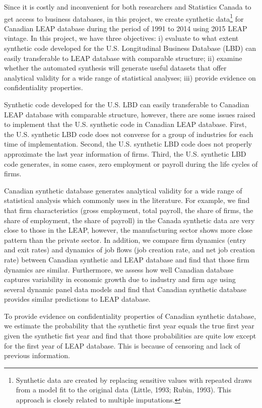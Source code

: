 \documentclass{article}
\begin{document}
Since it is costly and inconvenient for both researchers and Statistics Canada to get access to business databases, in this project, we create synthetic data\footnote{Synthetic data are created by replacing sensitive values with repeated draws from a model fit to the original data (Little, 1993; Rubin, 1993). This approach is closely related to multiple imputations.} for Canadian LEAP database during the period of 1991 to 2014 using 2015 LEAP vintage. In this project, we have three objectives: i) evaluate to what extent synthetic code developed for the U.S. Longitudinal Business Database (LBD) can easily transferable to LEAP database with comparable structure; ii) examine whether the automated synthesis will generate useful datasets that offer analytical validity for a wide range of statistical analyses; iii) provide evidence on confidentiality properties. 

Synthetic code developed for the U.S. LBD can easily transferable to Canadian LEAP database with comparable structure, however, there are some issues raised to implement that the U.S. synthetic code in Canadian LEAP database. First, the U.S. synthetic LBD code does not converse for a group of industries for each time of implementation. Second, the U.S. synthetic LBD code does not properly approximate the last year information of firms. Third, the U.S. synthetic LBD code generates, in some cases, zero employment or payroll during the life cycles of firms.   

Canadian synthetic database generates analytical validity for a wide range of statistical analysis which commonly uses in the literature. For example, we find that firm characteristics (gross employment, total payroll, the share of firms, the share of employment, the share of payroll) in the Canada synthetic data are very close to those in the LEAP, however, the manufacturing sector shows more close pattern than the private sector.  In addition, we compare firm dynamics (entry and exit rates) and dynamics of job flows (job creation rate, and net job creation rate) between Canadian synthetic and LEAP database and find that those firm dynamics are similar. Furthermore, we assess how well Canadian database captures variability in economic growth due to industry and firm age using several dynamic panel data models and find that Canadian synthetic database provides similar predictions to LEAP database. 

To provide evidence on confidentiality properties of Canadian synthetic database, we estimate the probability that the synthetic first year equals the true first year given the synthetic fist year and find that those probabilities are quite low except for the first year of LEAP database. This is because of censoring and lack of previous information. 
\end{document}
